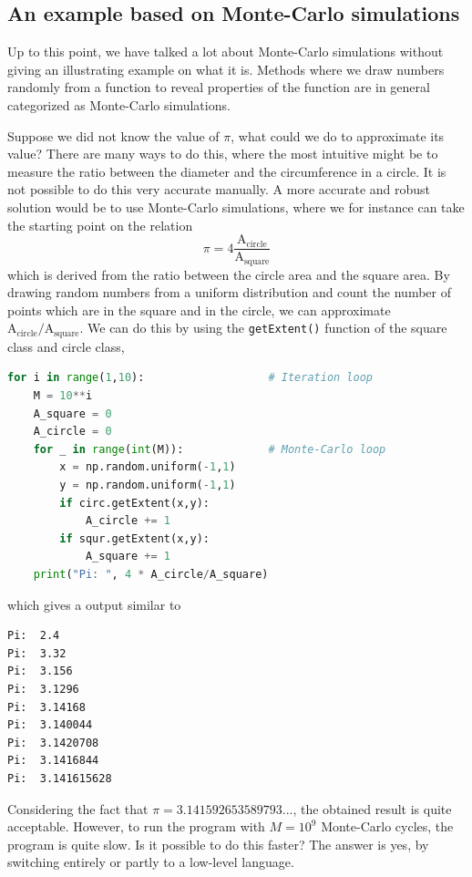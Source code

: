 \subsection{An example based on Monte-Carlo simulations}
Up to this point, we have talked a lot about Monte-Carlo simulations without giving an illustrating example on what it is. Methods where we draw numbers randomly from a function to reveal properties of the function are in general categorized as Monte-Carlo simulations. 

Suppose we did not know the value of $\pi$, what could we do to approximate its value? There are many ways to do this, where the most intuitive might be to measure the ratio between the diameter and the circumference in a circle. It is not possible to do this very accurate manually. A more accurate and robust solution would be to use Monte-Carlo simulations, where we for instance can take the starting point on the relation
\begin{equation}
\pi=4\frac{\text{A}_{\text{circle}}}{\text{A}_{\text{square}}}
\end{equation}
which is derived from the ratio between the circle area and the square area. By drawing random numbers from a uniform distribution and count the number of points which are in the square and in the circle, we can approximate $\text{A}_{\text{circle}}/\text{A}_{\text{square}}$. We can do this by using the \texttt{getExtent()} function of the square class and circle class,
\lstset{basicstyle=\scriptsize}
\begin{lstlisting}[language=python]
for i in range(1,10):					# Iteration loop
	M = 10**i
	A_square = 0
	A_circle = 0
	for _ in range(int(M)):				# Monte-Carlo loop
		x = np.random.uniform(-1,1)
		y = np.random.uniform(-1,1)
		if circ.getExtent(x,y):
			A_circle += 1
		if squr.getExtent(x,y):
			A_square += 1
	print("Pi: ", 4 * A_circle/A_square)
\end{lstlisting}
which gives a output similar to
\begin{lstlisting}
Pi:  2.4
Pi:  3.32
Pi:  3.156
Pi:  3.1296
Pi:  3.14168
Pi:  3.140044
Pi:  3.1420708
Pi:  3.1416844
Pi:  3.141615628
\end{lstlisting}
Considering the fact that $\pi=3.141592653589793...$, the obtained result is quite acceptable. However, to run the program with $M=10^9$ Monte-Carlo cycles, the program is quite slow. Is it possible to do this faster? The answer is yes, by switching entirely or partly to a low-level language.

